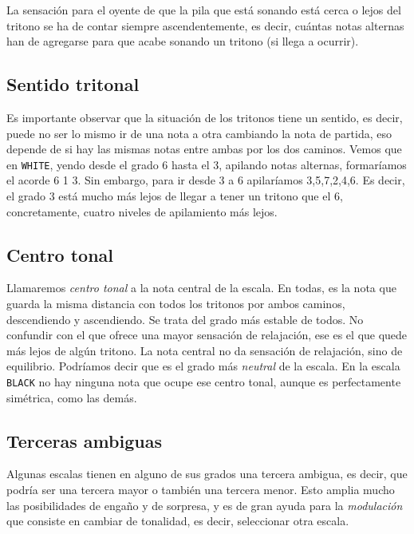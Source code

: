 \documentclass[]{article}
\begin{document}
La sensación para el oyente de que la pila que está sonando está cerca o lejos del tritono se ha de contar siempre ascendentemente, es decir, cuántas notas alternas han de agregarse para que acabe sonando un tritono (si llega a ocurrir).

\subsection{Sentido tritonal}
Es importante observar que la situación de los tritonos tiene un sentido, es decir, puede no ser lo mismo ir de una nota a otra cambiando la nota de partida, eso depende de si hay las mismas notas entre ambas por los dos caminos. Vemos que en \texttt{WHITE}, yendo desde el grado 6 hasta el 3, apilando notas alternas, formaríamos el acorde 6 1 3. Sin embargo, para ir desde 3 a 6 apilaríamos 3,5,7,2,4,6. Es decir, el grado 3 está mucho más lejos de llegar a tener un tritono que el 6, concretamente, cuatro niveles de apilamiento más lejos.

\subsection{Centro tonal}

Llamaremos \emph{centro tonal} a la nota central de la escala. En todas, es la nota que guarda la misma distancia con todos los tritonos por ambos caminos, descendiendo y ascendiendo. Se trata del grado más estable de todos. No confundir con el que ofrece una mayor sensación de relajación, ese es el que quede más lejos de algún tritono. La nota central no da sensación de relajación, sino de equilibrio. Podríamos decir que es el grado más \emph{neutral} de la escala. En la escala \texttt{BLACK} no hay ninguna nota que ocupe ese centro tonal, aunque es perfectamente simétrica, como las demás.

\subsection{Terceras ambiguas}

Algunas escalas tienen en alguno de sus grados una tercera ambigua, es decir, que podría ser una tercera mayor o también una tercera menor. Esto amplia mucho las posibilidades de engaño y de sorpresa, y es de gran ayuda para la \emph{modulación} que consiste en cambiar de tonalidad, es decir, seleccionar otra escala.
\end{document}
